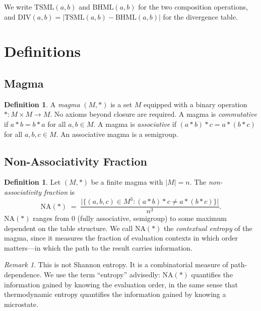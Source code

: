 \documentclass[11pt,a4paper]{article}
\theoremstyle{definition}
\newtheorem{definition}[theorem]{Definition}
\theoremstyle{remark}
\newtheorem{remark}[theorem]{Remark}
\newcommand{\NA}{\mathrm{NA}}
\newcommand{\DIV}{\mathrm{DIV}}
\newcommand{\TSML}{\mathrm{TSML}}
\newcommand{\BHML}{\mathrm{BHML}}
\begin{document}
We write $\TSML(a,b)$ and $\BHML(a,b)$ for the two composition operations, and $\DIV(a,b) = |\TSML(a,b) - \BHML(a,b)|$ for the divergence table.

\section{Definitions}\label{sec:defs}

\subsection{Magma}\label{sec:magma}

\begin{definition}\label{def:magma}
A \emph{magma} $(M, \ast)$ is a set $M$ equipped with a binary operation $\ast\colon M\times M \to M$. No axioms beyond closure are required. A magma is \emph{commutative} if $a\ast b = b\ast a$ for all $a,b\in M$. A magma is \emph{associative} if $(a\ast b)\ast c = a\ast (b\ast c)$ for all $a,b,c\in M$. An associative magma is a semigroup.
\end{definition}

\subsection{Non-Associativity Fraction}\label{sec:na-fraction}

\begin{definition}\label{def:na}
Let $(M,\ast)$ be a finite magma with $|M|=n$. The \emph{non-associativity fraction} is
\begin{equation}\label{eq:na}
\NA(\ast) \;=\; \frac{\bigl|\bigl\{(a,b,c)\in M^{3} : (a\ast b)\ast c \neq a\ast (b\ast c)\bigr\}\bigr|}{n^{3}}.
\end{equation}
$\NA(\ast)$ ranges from $0$ (fully associative, semigroup) to some maximum dependent on the table structure. We call $\NA(\ast)$ the \emph{contextual entropy} of the magma, since it measures the fraction of evaluation contexts in which order matters---in which the path to the result carries information.
\end{definition}

\begin{remark}\label{rem:not-shannon}
This is not Shannon entropy. It is a combinatorial measure of path-dependence. We use the term ``entropy'' advisedly: $\NA(\ast)$ quantifies the information gained by knowing the evaluation order, in the same sense that thermodynamic entropy quantifies the information gained by knowing a microstate.
\end{remark}
\end{document}
